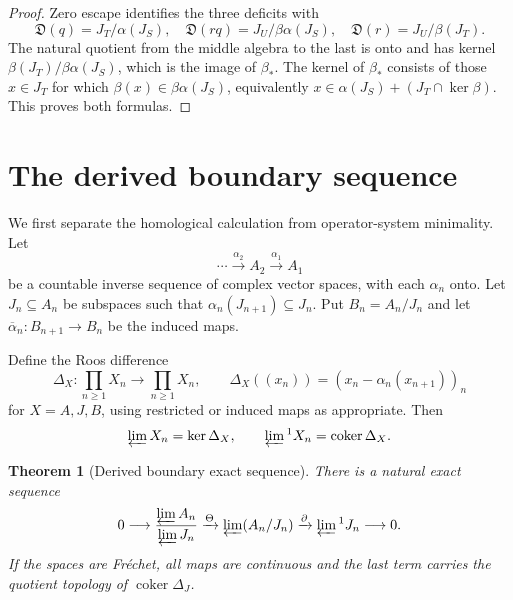 \documentclass[11pt,a4paper]{amsart}
\theoremstyle{plain}
\newtheorem{theorem}{Theorem}[section]
\theoremstyle{definition}
\newcommand{\Def}{\mathfrak D}
\newcommand{\coker}{\operatorname{coker}}
\begin{document}
\begin{proof}
Zero escape identifies the three deficits with
\[
 \Def(q)=J_T/\alpha(J_S),\quad
 \Def(rq)=J_U/\beta\alpha(J_S),\quad
 \Def(r)=J_U/\beta(J_T).
\]
The natural quotient from the middle algebra to the last is onto and has kernel
$\beta(J_T)/\beta\alpha(J_S)$, which is the image of $\beta_*$.  The kernel of $\beta_*$ consists
of those $x\in J_T$ for which $\beta(x)\in\beta\alpha(J_S)$, equivalently
$x\in\alpha(J_S)+(J_T\cap\ker\beta)$.  This proves both formulas.
\end{proof}

\section{The derived boundary sequence}\label{sec:derived}

We first separate the homological calculation from operator-system minimality.  Let
\[
 \cdots\xrightarrow{\alpha_2}A_2\xrightarrow{\alpha_1}A_1
\]
be a countable inverse sequence of complex vector spaces, with each $\alpha_n$ onto.  Let
$J_n\subseteq A_n$ be subspaces such that $\alpha_n(J_{n+1})\subseteq J_n$.  Put
$B_n=A_n/J_n$ and let $\overline\alpha_n:B_{n+1}\to B_n$ be the induced maps.

Define the Roos difference
\begin{equation}\label{eq:Roos}
 \Delta_X:\prod_{n\geq1}X_n\longrightarrow\prod_{n\geq1}X_n,
 \qquad
 \Delta_X((x_n))=(x_n-\alpha_n(x_{n+1}))_n
\end{equation}
for $X=A,J,B$, using restricted or induced maps as appropriate.  Then
\[
 \varprojlim X_n=\ker\Delta_X,\qquad
 \varprojlim{}^1X_n=\coker\Delta_X.
\]

\begin{theorem}[Derived boundary exact sequence]\label{thm:derived-exact}
There is a natural exact sequence
\begin{equation}\label{eq:derived-exact}
 0\longrightarrow
 \frac{\varprojlim A_n}{\varprojlim J_n}
 \xrightarrow{\Theta}
 \varprojlim(A_n/J_n)
 \xrightarrow{\partial}
 \varprojlim{}^1J_n
 \longrightarrow0.
\end{equation}
If the spaces are Fr\'echet, all maps are continuous and the last term carries the quotient
topology of $\coker\Delta_J$.
\end{theorem}
\end{document}
